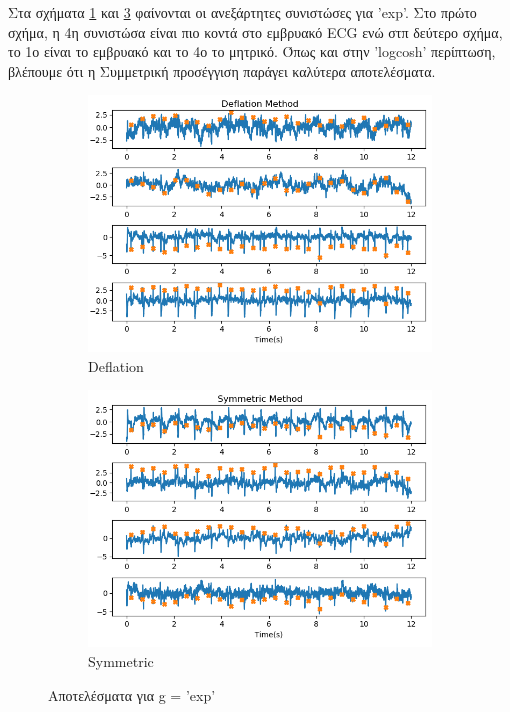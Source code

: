 \noindent Στα σχήματα \en \ref{fig:5.22a} \gr και \en \ref{fig:5.22b} \gr φαίνονται οι ανεξάρτητες συνιστώσες για \en 'exp'. \gr Στο πρώτο σχήμα, η 4η συνιστώσα είναι πιο κοντά στο εμβρυακό \en ECG \gr ενώ στπ δεύτερο σχήμα, το 1ο είναι το εμβρυακό και το 4ο το μητρικό. Όπως και στην \en 'logcosh' \gr περίπτωση, βλέπουμε ότι η Συμμετρική προσέγγιση παράγει καλύτερα αποτελέσματα.
\begin{figure}[H]
    \centering
    \begin{subfigure}{0.48 \textwidth}
        \centering
       \includegraphics[width=\textwidth]{r01database/exp_def.png} \en
        \caption{Deflation} \gr
        \label{fig:5.22a}
    \end{subfigure}
    \hfill
    \begin{subfigure}{0.48 \textwidth}
        \centering
       \includegraphics[width=\textwidth]{r01database/exp_sym.png} \en
        \en
        \caption{Symmetric} \gr
        \label{fig:5.22b}
    \end{subfigure}
    \gr
    \caption{Αποτελέσματα για \en g = 'exp' \gr}
\end{figure}
